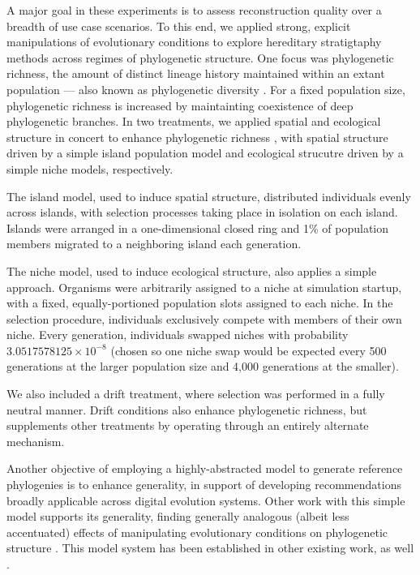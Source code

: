 A major goal in these experiments is to assess reconstruction quality over a breadth of use case scenarios.
To this end, we applied strong, explicit manipulations of evolutionary conditions to explore hereditary stratigtaphy methods across regimes of phylogenetic structure.
One focus was phylogenetic richness, the amount of distinct lineage history maintained within an extant population --- also known as phylogenetic diversity \citep{tucker2017guide}.
For a fixed population size, phylogenetic richness is increased by maintainting coexistence of deep phylogenetic branches.
In two treatments, we applied spatial and ecological structure in concert to enhance phylogenetic richness \citep{moreno2024ecology,gomez2019understanding,valiente2007facilitation}, with spatial structure driven by a simple island population model and ecological strucutre driven by a simple niche models, respectively.

The island model, used to induce spatial structure, distributed individuals evenly across islands, with selection processes taking place in isolation on each island.
Islands were arranged in a one-dimensional closed ring and 1\% of population members migrated to a neighboring island each generation.

The niche model, used to induce ecological structure, also applies a simple approach.
Organisms were arbitrarily assigned to a niche at simulation startup, with a fixed, equally-portioned population slots assigned to each niche.
In the selection procedure, individuals exclusively compete with members of their own niche.
Every generation, individuals swapped niches with probability $3.0517578125 \times 10^{-8}$ (chosen so one niche swap would be expected every 500 generations at the larger population size and 4,000 generations at the smaller).

We also included a drift treatment, where selection was performed in a fully neutral manner.
Drift conditions also enhance phylogenetic richness, but supplements other treatments by operating through an entirely alternate mechanism.

Another objective of employing a highly-abstracted model to generate reference phylogenies is to enhance generality, in support of developing recommendations broadly applicable across digital evolution systems.
Other work with this simple model supports its generality, finding generally analogous (albeit less accentuated) effects of manipulating evolutionary conditions on phylogenetic structure \citep{moreno2024ecology}.
This model system has been established in other existing work, as well \citep{moreno2023toward}.

